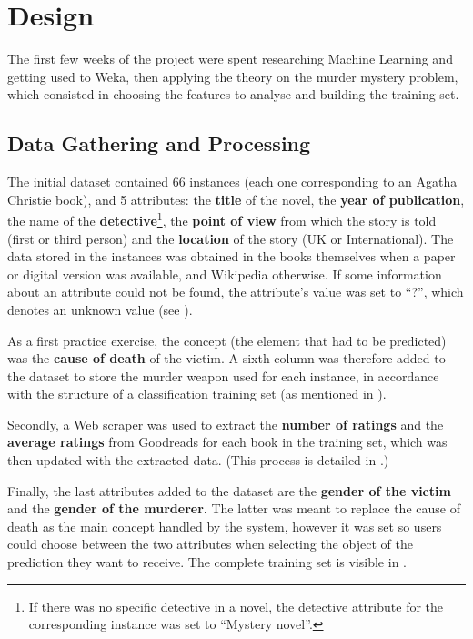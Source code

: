 \documentclass{mproj}
\begin{document}
\chapter{Design}

The first few weeks of the project were spent researching Machine Learning and getting used to Weka, then applying the theory on the murder mystery problem, which consisted in choosing the features to analyse and building the training set. \par

\section{Data Gathering and Processing}\label{data_process}

The initial dataset contained 66 instances (each one corresponding to an Agatha Christie book), and 5 attributes: the \textbf{title} of the novel, the \textbf{year of publication}, the name of the \textbf{detective}\footnote{If there was no specific detective in a novel, the detective attribute for the corresponding instance was set to ``Mystery novel''.}, the \textbf{point of view} from which the story is told (first or third person) and the \textbf{location} of the story (UK or International). The data stored in the instances was obtained in the books themselves when a paper or digital version was available, and Wikipedia otherwise. \cite{wikipedia} If some information about an attribute could not be found, the attribute's value was set to ``?'', which denotes an unknown value (see ).\par

As a first practice exercise, the concept (the element that had to be predicted) was the \textbf{cause of death} of the victim. A sixth column was therefore added to the dataset to store the murder weapon used for each instance, in accordance with the structure of a classification training set (as mentioned in ).\par

Secondly, a Web scraper was used to extract the \textbf{number of ratings} and the \textbf{average ratings} from Goodreads \cite{goodreads} for each book in the training set, which was then updated with the extracted data. (This process is detailed in .)\par

Finally, the last attributes added to the dataset are the \textbf{gender of the victim} and the \textbf{gender of the murderer}. The latter was meant to replace the cause of death as the main concept handled by the system, however it was set so users could choose between the two attributes when selecting the object of the prediction they want to receive. The complete training set is visible in .\par
\end{document}
